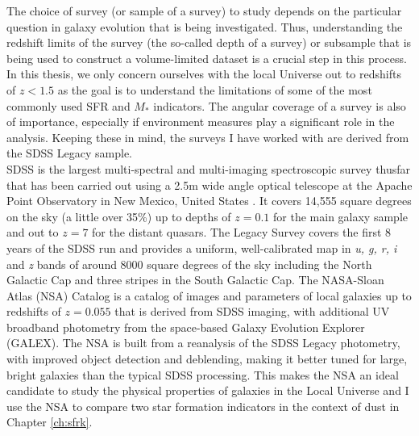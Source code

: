 The choice of survey (or sample of a survey) to study depends on the particular question in galaxy evolution that is being investigated. Thus, understanding the redshift limits of the survey (the so-called depth of a survey) or subsample that is being used to construct a volume-limited dataset is a crucial step in this process. In this thesis, we only concern ourselves with the local Universe out to redshifts of $z < 1.5$ as the goal is to understand the limitations of some of the most commonly used SFR and $M_{*}$ indicators. The angular coverage of a survey is also of importance, especially if environment measures play a significant role in the analysis. Keeping these in mind, the surveys I have worked with are derived from the SDSS Legacy sample.\\

SDSS is the largest multi-spectral and multi-imaging spectroscopic survey thusfar that has been carried out using a 2.5m wide angle optical telescope at the Apache Point Observatory \citet{2006AJ....131.2332G} in New Mexico, United States \citep{2000AJ....120.1579Y, 2002AJ....124.1810S}. It covers 14,555 square degrees on the sky (a little over 35\%) up to depths of $z= 0.1$ for the main galaxy sample and out to $z = 7$ for the distant quasars. The Legacy Survey covers the first 8 years of the SDSS run and provides a uniform, well-calibrated map in \emph{u, g, r, i} and \emph{z} bands of around 8000 square degrees of the sky including the North Galactic Cap and three stripes in the South Galactic Cap. The NASA-Sloan Atlas (NSA) Catalog is a catalog of images and parameters of local galaxies up to redshifts of $z = 0.055$ that is derived from SDSS imaging, with additional UV broadband photometry from the space-based Galaxy Evolution Explorer (GALEX). The NSA is built from a reanalysis \citet{2011AJ....142...31B} of the SDSS Legacy photometry, with improved object detection and deblending, making it better tuned for large, bright galaxies than the typical SDSS processing. This makes the NSA an ideal candidate to study the physical properties of galaxies in the Local Universe and I use the NSA to compare two star formation indicators in the context of dust in Chapter \ref{ch:sfrk}.\\

